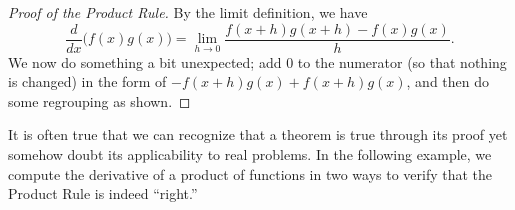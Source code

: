 \begin{proof}[Proof of the Product Rule]
By the limit definition, we have 
\[\frac{d}{dx}\Big(f(x)g(x)\Big) =\lim_{h\to0} \frac{f(x+h)g(x+h)-f(x)g(x)}{h}.\]
We now do something a bit unexpected; add 0 to the numerator (so that nothing is changed) in the form of $-f(x+h)g(x)+f(x+h)g(x)$, and then do some regrouping as shown.

\end{proof}

It is often true that we can recognize that a theorem is true through its proof yet somehow doubt its applicability to real problems. In the following example, we compute the derivative of a product of functions in two ways to verify that the Product Rule is indeed ``right.''

